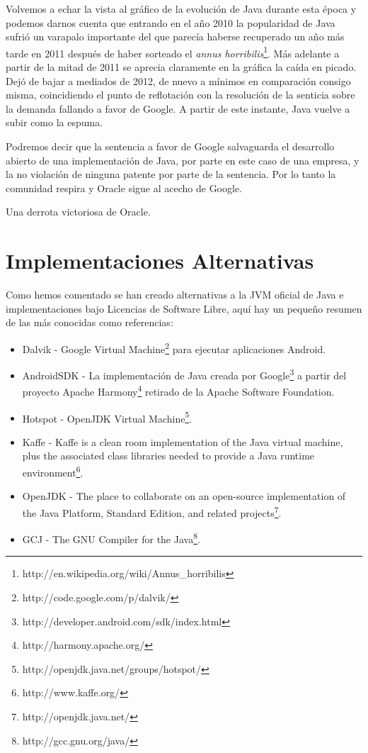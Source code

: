 \documentclass[11pt]{scrartcl}
\begin{document}
Volvemos a echar la vista al gráfico de la evolución de Java durante esta época y podemos darnos cuenta que entrando en el año 2010 la popularidad de Java sufrió un varapalo importante del que parecía haberse recuperado un año más tarde en 2011 después de haber sorteado el \emph{annus horribilis}\footnote{http://en.wikipedia.org/wiki/Annus\_horribilis}. Más adelante a partir de la mitad de 2011 se aprecia claramente en la gráfica la caída en picado. Dejó de bajar a mediados de 2012, de nuevo a mínimos en comparación consigo misma, coincidiendo el punto de reflotación con la resolución de la senticia sobre la demanda fallando a favor de Google. A partir de este instante, Java vuelve a subir como la espuma.

Podremos decir que la sentencia a favor de Google salvaguarda el desarrollo abierto de una implementación de Java, por parte en este caso de una empresa, y la no violación de ninguna patente por parte de la sentencia. Por lo tanto la comunidad respira y Oracle sigue al acecho de Google.

Una derrota victoriosa de Oracle.

\section{Implementaciones Alternativas}

Como hemos comentado se han creado alternativas a la JVM oficial de Java e implementaciones bajo Licencias de Software Libre, aquí hay un pequeño resumen de las más conocidas como referencias:
\begin{itemize}
    \item Dalvik - Google Virtual Machine\footnote{http://code.google.com/p/dalvik/} para ejecutar aplicaciones Android.
    \item AndroidSDK - La implementación de Java creada por Google\footnote{http://developer.android.com/sdk/index.html} a partir del proyecto Apache Harmony\footnote{http://harmony.apache.org/} retirado de la Apache Software Foundation.
    \item Hotspot - OpenJDK Virtual Machine\footnote{http://openjdk.java.net/groups/hotspot/}.
    \item Kaffe - Kaffe is a clean room implementation of the Java virtual machine, plus the associated class libraries needed to provide a Java runtime environment\footnote{http://www.kaffe.org/}.
    \item OpenJDK - The place to collaborate on an open-source implementation of the Java Platform, Standard Edition, and related projects\footnote{http://openjdk.java.net/}.
    \item GCJ - The GNU Compiler for the Java\footnote{http://gcc.gnu.org/java/}.
\end{itemize}
\end{document}
